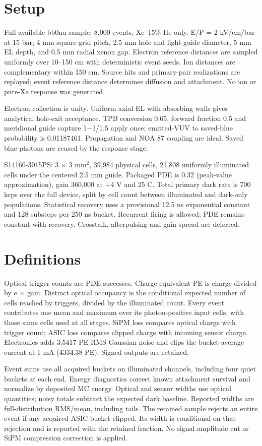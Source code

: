\documentclass[11pt,a4paper]{article}
\begin{document}
\section*{Setup}
Full available bb0nu sample: 8,000 events, Xe--15\% He only. E/P = 2 kV/cm/bar at 15 bar; 4 mm square-grid pitch, 2.5 mm hole and light-guide diameter, 5 mm EL depth, and 0.5 mm radial xenon gap. Electron reference distances are sampled uniformly over 10--150 cm with deterministic event seeds. Ion distances are complementary within 150 cm. Source hits and primary-pair realizations are replayed; event reference distance determines diffusion and attachment. No ion or pure-Xe response was generated.

Electron collection is unity. Uniform axial EL with absorbing walls gives analytical hole-exit acceptance. TPB conversion 0.65, forward fraction 0.5 and meridional guide capture 1$-$1/1.5 apply once; emitted-VUV to saved-blue probability is 0.01187461. Propagation and NOA 87 coupling are ideal. Saved blue photons are reused by the response stage.

S14160-3015PS: 3 $\times$ 3 mm$^2$, 39,984 physical cells, 21,808 uniformly illuminated cells under the centered 2.5 mm guide. Packaged PDE is 0.32 (peak-value approximation), gain 360,000 at +4 V and 25 C. Total primary dark rate is 700 kcps over the full device, split by cell count between illuminated and dark-only populations. Statistical recovery uses a provisional 12.5 ns exponential constant and 128 substeps per 250 ns bucket. Recurrent firing is allowed; PDE remains constant with recovery. Crosstalk, afterpulsing and gain spread are deferred.
\section*{Definitions}
Optical trigger counts are PDE successes. Charge-equivalent PE is charge divided by e $\times$ gain. Distinct optical occupancy is the conditional expected number of cells reached by triggers, divided by the illuminated count. Every event contributes one mean and maximum over its photon-positive input cells, with those same cells used at all stages. SiPM loss compares optical charge with trigger count; ASIC loss compares clipped charge with incoming sensor charge. Electronics adds 3.5417 PE RMS Gaussian noise and clips the bucket-average current at 1 mA (4334.38 PE). Signed outputs are retained.

Event sums use all acquired buckets on illuminated channels, including four quiet buckets at each end. Energy diagnostics correct known attachment survival and normalize by deposited MC energy. Optical and sensor widths use optical quantities; noisy totals subtract the expected dark baseline. Reported widths are full-distribution RMS/mean, including tails. The retained sample rejects an entire event if any acquired ASIC bucket clipped. Its width is conditional on that rejection and is reported with the retained fraction. No signal-amplitude cut or SiPM compression correction is applied.
\end{document}
